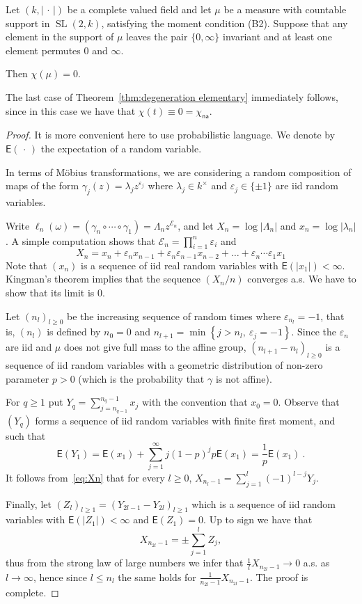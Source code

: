 \documentclass[AHL,Unicode,longabstracts]{cedram}
\DeclareMathOperator{\SL}{SL}
\newcommand{\sE}{\mathsf{E}}
\newcommand{\e}{\varepsilon}
\newcommand{\set}[1]{\left\{#1\right\}}
\newcommand{\abs}[1]{\left\vert#1\right\vert}
\newcommand{\unsur}[1]{\frac{1}{#1}}
\newcommand{\la}{\lambda}
\newcommand{\na}{\mathsf{na}}
\newcommand{\SLk}{\SL(2,k)}
\begin{document}
\begin{prop}\label{prop:formula 0infty}
Let $(k,\abs{{\,\cdot\,}})$ be a complete valued field and let $\mu$ be a measure with countable support in $\SLk$, satisfying the moment condition (B2). Suppose that any element in the support of $\mu$ leaves the pair $\{0,\infty\}$ invariant and at least one element permutes $0$ and $\infty$.

Then $\chi(\mu) = 0$.
\end{prop}

The last case of Theorem~\ref{thm:degeneration elementary} immediately follows, since in this case we have that $\chi(t) \equiv 0 = \chi_\na $.

\begin{proof}
It is more convenient here to use probabilistic language. We denote by $\sE({\,\cdot\,})$ the expectation of a random variable.

In terms of M\"obius transformations, we are considering a random composition of maps of the form $\gamma_j(z) = \la_j z^{\e_j}$ where $\lambda_j\in k^\times$ and $\e_j \in \{\pm1\}$ are iid random variables.

Write $\ell_n(\omega) = (\gamma_n \circ \cdots \circ \gamma_1) = \Lambda_n z^{\mathcal{E}_n}$, and let $X_n = \log |\Lambda_n|$ and $x_n = \log|\lambda_n|$. A simple computation shows that $\mathcal{E}_n = \prod_{i=1}^{n} \e_i$ and
\begin{equation}\label{eq:Xn}
X_n = x_n + \e_n x_{n-1} + \e_n \e_{n-1} x_{n-2} + \ldots + \e_n\cdots \e_1 x_1
\end{equation}
Note that $(x_n)$ is a sequence of iid real random variables with $\sE(\abs{x_1})<\infty$. Kingman's theorem implies that the sequence $(X_n/n)$ converges a.s. We have to show that its limit is 0.

Let $(n_l)_{l\ge0}$ be the increasing sequence of random times where $\e_{n_l} = -1$, that is, $(n_l)$ is defined by $n_0=0$ and $n_{l+1} = \min\set{j> n_l, \ \e_j = -1}$. Since the $\e_n$ are iid and $\mu$ does not give full mass to the affine group, $(n_{l+1} - n_l)_{l\geq 0}$ is a sequence of iid random variables with a geometric distribution of non-zero parameter $p>0$ (which is the probability that $\gamma$ is not affine).

For $q\geq 1$ put $Y_q = \sum_{j=n_{q-1}}^{n_{q}-1} x_j$ with the convention that $x_0=0$. Observe that $(Y_q)$ forms a sequence of iid random variables with finite first moment, and such that
\[
\sE({Y_1}) = \sE({x_1})+ \sum_{j=1}^{\infty} j(1-p)^j p \sE({x_1}) = \unsur{p} \sE({x_1})~.
\]
It follows from~\eqref{eq:Xn} that for every $l\geq 0$, $X_{n_l-1} = \sum_{j=1}^l (-1)^{l-j} Y_j$.

Finally, let $(Z_{l})_{l\geq 1} =(Y_{2l-1}-Y_{2l})_{l\geq 1} $ which is a sequence of iid random variables with $\sE(\abs{Z_1})<\infty$ and $\sE({Z_1})=0$. Up to sign we have that
\[
X_{n_{2l}-1} = \pm \sum_{j=1}^l Z_j,
\]
thus from the strong law of large numbers we infer that $\unsur{l} X_{n_{2l}-1} \to 0$ a.s. as $l\to \infty$, hence since $l\le n_l$ the same holds for $\unsur{n_{2l}-1} X_{n_{2l}-1}$. The proof is complete.
\end{proof}
\end{document}
